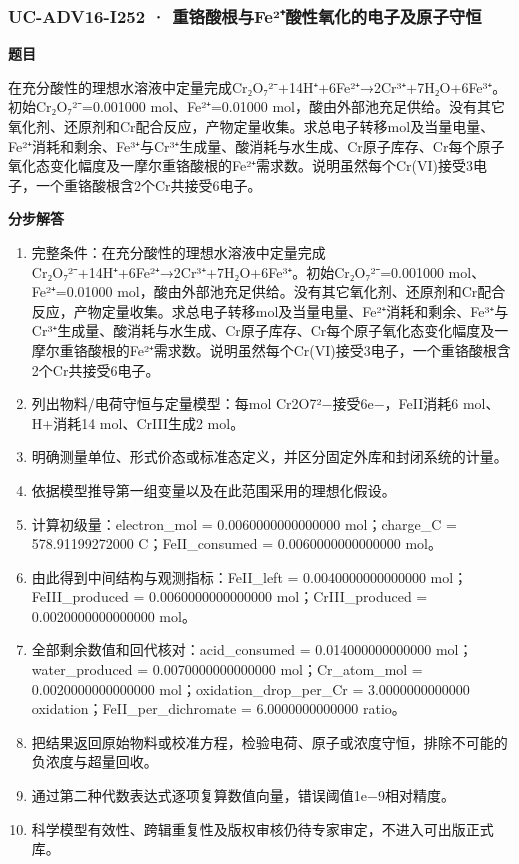 \documentclass[UTF8,11pt,a4paper]{ctexart}
\begin{document}
\subsubsection*{UC-ADV16-I252 · 重铬酸根与Fe²⁺酸性氧化的电子及原子守恒}
\noindent\textbf{题目}\par
在充分酸性的理想水溶液中定量完成Cr₂O₇²⁻+14H⁺+6Fe²⁺→2Cr³⁺+7H₂O+6Fe³⁺。初始Cr₂O₇²⁻=0.001000 mol、Fe²⁺=0.01000 mol，酸由外部池充足供给。没有其它氧化剂、还原剂和Cr配合反应，产物定量收集。求总电子转移mol及当量电量、Fe²⁺消耗和剩余、Fe³⁺与Cr³⁺生成量、酸消耗与水生成、Cr原子库存、Cr每个原子氧化态变化幅度及一摩尔重铬酸根的Fe²⁺需求数。说明虽然每个Cr(VI)接受3电子，一个重铬酸根含2个Cr共接受6电子。\par
\medskip\noindent\textbf{分步解答}
\begin{enumerate}
\item 完整条件：在充分酸性的理想水溶液中定量完成Cr₂O₇²⁻+14H⁺+6Fe²⁺→2Cr³⁺+7H₂O+6Fe³⁺。初始Cr₂O₇²⁻=0.001000 mol、Fe²⁺=0.01000 mol，酸由外部池充足供给。没有其它氧化剂、还原剂和Cr配合反应，产物定量收集。求总电子转移mol及当量电量、Fe²⁺消耗和剩余、Fe³⁺与Cr³⁺生成量、酸消耗与水生成、Cr原子库存、Cr每个原子氧化态变化幅度及一摩尔重铬酸根的Fe²⁺需求数。说明虽然每个Cr(VI)接受3电子，一个重铬酸根含2个Cr共接受6电子。
\item 列出物料/电荷守恒与定量模型：每mol Cr2O7²−接受6e−，FeII消耗6 mol、H+消耗14 mol、CrIII生成2 mol。
\item 明确测量单位、形式价态或标准态定义，并区分固定外库和封闭系统的计量。
\item 依据模型推导第一组变量以及在此范围采用的理想化假设。
\item 计算初级量：electron\_mol = 0.0060000000000000 mol；charge\_C = 578.91199272000 C；FeII\_consumed = 0.0060000000000000 mol。
\item 由此得到中间结构与观测指标：FeII\_left = 0.0040000000000000 mol；FeIII\_produced = 0.0060000000000000 mol；CrIII\_produced = 0.0020000000000000 mol。
\item 全部剩余数值和回代核对：acid\_consumed = 0.014000000000000 mol；water\_produced = 0.0070000000000000 mol；Cr\_atom\_mol = 0.0020000000000000 mol；oxidation\_drop\_per\_Cr = 3.0000000000000 oxidation；FeII\_per\_dichromate = 6.0000000000000 ratio。
\item 把结果返回原始物料或校准方程，检验电荷、原子或浓度守恒，排除不可能的负浓度与超量回收。
\item 通过第二种代数表达式逐项复算数值向量，错误阈值1e−9相对精度。
\item 科学模型有效性、跨辑重复性及版权审核仍待专家审定，不进入可出版正式库。
\end{enumerate}
\end{document}
